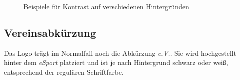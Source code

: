 \documentclass{article}
\begin{document}
\begin{figure}[H]
\begin{centering}
\hfill
{}
\hfill

\hfill
{}
\hfill
\end{centering}
\caption{Beispiele für Kontrast auf verschiedenen Hintergründen}
\end{figure}

\subsection{Vereinsabkürzung}

Das Logo trägt im Normalfall noch die Abkürzung \emph{e.V.}.
Sie wird hochgestellt hinter dem \emph{eSport} platziert und ist je nach Hintergrund schwarz oder weiß, entsprechend der regulären Schriftfarbe. %
\end{document}
